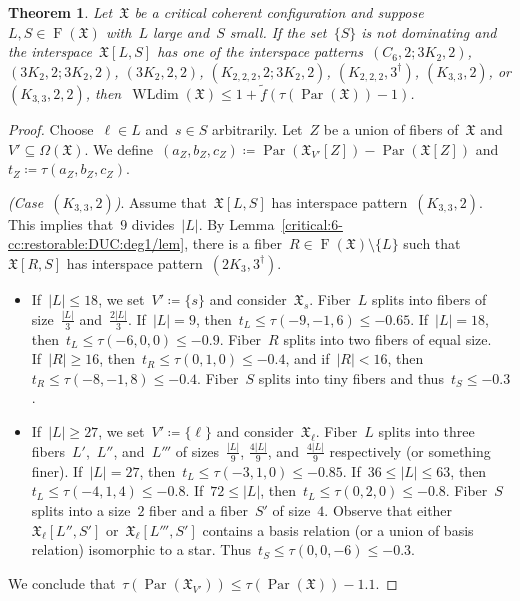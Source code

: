 \documentclass[english,a4paper]{article}
\theoremstyle{plain}
\newtheorem{theorem}             {Theorem}[section]
\theoremstyle{definition}
\DeclareMathOperator{\Fibers}{F}
\newcommand{\coherentConfig}{\ensuremath{\mathfrak{X}}}
\newcommand{\fibers}[1]{\ensuremath{\Fibers \left( #1 \right)}}
\newcommand{\interspace}[2]{\ensuremath{\coherentConfig[#1,#2]}}
\newcommand{\vertices}{\ensuremath{\Omega}}
\DeclareMathOperator*{\WLdim}{WLdim}
\newcommand{\wldim}[1]{\ensuremath{\WLdim\left(#1\right)}}
\newcommand{\f}{f}
\DeclareMathOperator{\parameters}{Par}
\newcommand{\ipsixMatchingTwice}        {\ensuremath{(\disjointCliques{3}{2},2,2)}}
\newcommand{\ipsixMatchingMatching}     {\ensuremath{(\disjointCliques{3}{2},2;\disjointCliques{3}{2},2)}}
\newcommand{\ipsixMatchingAndCycle}     {\ensuremath{(\cycle{6},2;\disjointCliques{3}{2},2)}}
\newcommand{\ipsixMatchingAndComplement}{\ensuremath{(\clique{2,2,2},2;\disjointCliques{3}{2},2)}}
\newcommand{\ipsixTriangle}               {\ensuremath{(\disjointCliques{2}{3},3^\dag)}}
\newcommand{\ipsixTriangleComplement}     {\ensuremath{(\clique{3,3},2)}}
\newcommand{\ipsixTriangleComplementTwice}{\ensuremath{(\clique{3,3},2,2)}}
\newcommand{\ipsixMatchingComplement} {\ensuremath{(\clique{2,2,2},3^\dag)}}
\newcommand{\clique}[1]{\ensuremath{K_{#1}}}
\newcommand{\cycle}[1]{\ensuremath{C_{#1}}}
\newcommand{\disjointCliques}[2]{\ensuremath{#1 \clique{#2}}}
\begin{document}
\begin{theorem}
\label{local:L-S/thm}
    Let~$\coherentConfig$ be a critical coherent configuration and suppose~$L,S \in \fibers{\coherentConfig}$ with~$L$ large and~$S$ small.
    If the set~$\{S\}$ is not dominating and the interspace~$\interspace{L}{S}$ has one of the interspace patterns~$\ipsixMatchingAndCycle$, $\ipsixMatchingMatching$, $\ipsixMatchingTwice$, $\ipsixMatchingAndComplement$, $\ipsixMatchingComplement$, $\ipsixTriangleComplement$, or $\ipsixTriangleComplementTwice$,
    then~$\wldim{\coherentConfig} \leq 1 + \widetilde{\f}( \tau(\parameters(\coherentConfig)) - 1)$.
\end{theorem}
\begin{proof}
    Choose~$\ell \in L$ and~$s\in S$ arbitrarily.
    Let~$Z$ be a union of fibers of~$\coherentConfig$ and~$V' \subseteq \vertices(\coherentConfig)$.
    We define~$(a_Z,b_Z,c_Z) \coloneqq \parameters(\coherentConfig_{V'}[Z]) - \parameters(\coherentConfig[Z])$ and~$t_Z \coloneqq \tau(a_Z,b_Z,c_Z)$.

    \textit{(Case~$\ipsixTriangleComplement$)}.
    Assume that~$\interspace{L}{S}$ has interspace pattern~$\ipsixTriangleComplement$.
    This implies that~$9$ divides~$|L|$.
    By Lemma~\ref{critical:6-cc:restorable:DUC:deg1/lem}, there is a fiber~$R \in \fibers{\coherentConfig}\setminus\{L\}$ such that~$\interspace{R}{S}$ has interspace pattern~$\ipsixTriangle$.
    \begin{itemize}
        \item
        If~$|L| \leq 18$, we set~$V' \coloneqq \{s\}$ and consider~$\coherentConfig_s$.
        Fiber~$L$ splits into fibers of size~$\frac{|L|}{3}$ and~$\frac{2|L|}{3}$.
        If~$|L| = 9$, then~$t_L \leq \tau(-9,-1,6) \leq -0.65$.
        If~$|L| = 18$, then~$t_L \leq \tau(-6,0,0) \leq -0.9$.
        Fiber~$R$ splits into two fibers of equal size.
        If~$|R| \geq 16$, then~$t_R \leq \tau(0,1,0)\leq-0.4$, and
        if~$|R| < 16$, then~$t_R \leq \tau(-8,-1,8) \leq -0.4$.
        Fiber~$S$ splits into tiny fibers and thus~$t_S \leq -0.3$.

        \item
        If~$|L| \geq 27$,  we set~$V' \coloneqq \{\ell\}$ and consider~$\coherentConfig_\ell$.
        Fiber~$L$ splits into three fibers~$L'$,~$L''$, and~$L'''$ of sizes~$\frac{|L|}{9}$, $\frac{4|L|}{9}$, and~$\frac{4|L|}{9}$ respectively (or something finer).
        If~$|L| = 27$, then~$t_L \leq \tau(-3,1,0) \leq -0.85$.
        If~$36 \leq |L| \leq 63$, then~$t_L \leq \tau(-4,1,4) \leq -0.8$.
        If~$72 \leq |L|$, then~$t_L \leq \tau(0,2,0) \leq -0.8$.
        Fiber~$S$ splits into a size~$2$ fiber and a fiber~$S'$ of size~$4$.
        Observe that either~$\coherentConfig_\ell[L'',S']$ or~$\coherentConfig_\ell[L''',S']$ contains a basis relation (or a union of basis relation) isomorphic to a star.
        Thus~$t_S \leq \tau(0,0,-6) \leq -0.3$.
    \end{itemize}
    We conclude that~$\tau(\parameters(\coherentConfig_{V'})) \leq \tau(\parameters(\coherentConfig)) - 1.1$.



\end{proof}
\end{document}
